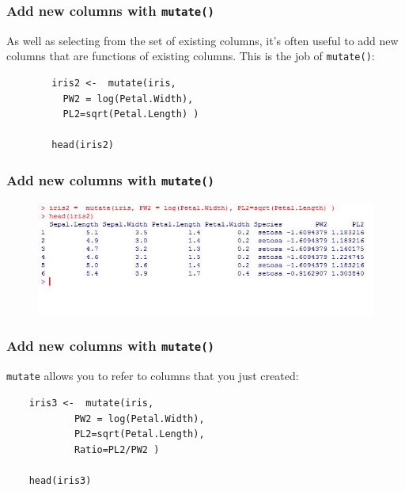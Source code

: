 \documentclass{beamer}
\begin{document}
\begin{frame}[fragile]
\frametitle{Add new columns with \texttt{mutate()} }
	
As well as selecting from the set of existing columns, it’s often useful to add new columns that are functions of existing columns. This is the job of \texttt{mutate()}:

\begin{framed}
		\begin{verbatim}
		iris2 <-  mutate(iris, 
		  PW2 = log(Petal.Width), 
		  PL2=sqrt(Petal.Length) )
		
		head(iris2)
		\end{verbatim}
\end{framed}
\end{frame}
\begin{frame}
\frametitle{Add new columns with \texttt{mutate()} }
\begin{figure}
\centering
\includegraphics[width=1.2\linewidth]{images/irismutate}
		
\end{figure}
	
\end{frame}
\begin{frame}[fragile]
	
	\frametitle{Add new columns with \texttt{mutate()} }
	\texttt{mutate} allows you to refer to columns that you just created:
\begin{framed}	
	\begin{verbatim}
	iris3 <-  mutate(iris, 
			PW2 = log(Petal.Width), 
			PL2=sqrt(Petal.Length), 
			Ratio=PL2/PW2 )
	
	head(iris3)
	\end{verbatim}
\end{framed}
\end{frame} 
\end{document}
